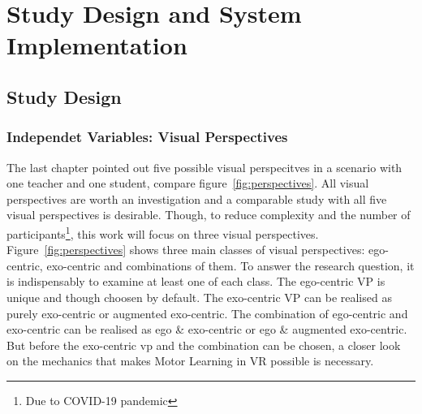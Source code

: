 \chapter{Study Design and System Implementation}
\label{chapter:studysetting_conduction}
\section{Study Design}
\subsection{Independet Variables: Visual Perspectives}
The last chapter pointed out five possible visual perspecitves in a scenario with one teacher and one student, compare figure~\ref{fig:perspectives}. All visual perspectives are worth an investigation and a comparable study with all five visual perspectives is desirable. Though, to reduce complexity and the number of participants\footnote{Due to COVID-19 pandemic}, this work will focus on three visual perspectives.\\
Figure~\ref{fig:perspectives} shows three main classes of visual perspectives: ego-centric, exo-centric and combinations of them. To answer the research question, it is indispensably to examine at least one of each class. The ego-centric VP is unique and though choosen by default. The exo-centric VP can be realised as purely exo-centric or augmented exo-centric. The combination of ego-centric and exo-centric can be realised as ego \& exo-centric or ego \& augmented exo-centric. But before the exo-centric vp and the combination can be chosen, a closer look on the mechanics that makes Motor Learning in VR possible is necessary.

